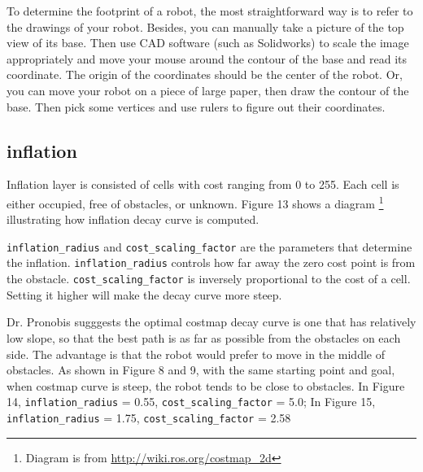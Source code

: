 \documentclass[12pt]{article}
\begin{document}
To determine the footprint of a robot, the most straightforward way is to refer to the drawings of your robot. Besides, you can manually take a picture of the top view of its base. Then use CAD software (such as Solidworks) to scale the image appropriately and move your mouse around the contour of the base and read its coordinate. The origin of the coordinates should be the center of the robot. Or, you can move your robot on a piece of large paper, then draw the contour of the base. Then pick some vertices and use rulers to figure out their coordinates.

\subsection{inflation} 
Inflation layer is consisted of cells with cost ranging from 0 to 255. Each cell is either occupied, free of obstacles, or unknown. Figure 13 shows a diagram \footnote{Diagram is from \url{http://wiki.ros.org/costmap_2d}} illustrating how inflation decay curve is computed.

\texttt{inflation\_radius} and \texttt{cost\_scaling\_factor} are the parameters that determine the inflation. \texttt{inflation\_radius} controls how far away the zero cost point is from the obstacle. \texttt{cost\_scaling\_factor} is inversely proportional to the cost of a cell. Setting it higher will make the decay curve more steep.

Dr. Pronobis sugggests the optimal costmap decay curve is one that has relatively low slope, so that the best path is as far as possible from the obstacles on each side. The advantage is that the robot would prefer to move in the middle of obstacles.  As shown in Figure 8 and 9, with the same starting point and goal, when costmap curve is steep, the robot tends to be close to obstacles. In Figure 14, \texttt{inflation\_radius} = 0.55, \texttt{cost\_scaling\_factor} = 5.0; In Figure 15, \texttt{inflation\_radius} = 1.75, \texttt{cost\_scaling\_factor} = 2.58
\end{document}
